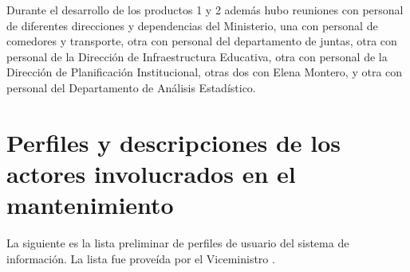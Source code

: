 \documentclass[9pt,a4paper]{IEEEtran}
\begin{document}
Durante el desarrollo de los productos 1 y 2 adem\'as hubo reuniones con personal de diferentes direcciones y dependencias del Ministerio, una con personal de comedores y transporte, otra con personal del departamento de juntas, otra con personal de la Direcci\'on de Infraestructura Educativa, otra con personal de la Direcci\'on de Planificaci\'on Institucional, otras dos con Elena Montero, y otra con personal del Departamento de An\'alisis Estad\'istico.

\section{Perfiles y descripciones de los actores involucrados en el mantenimiento} \label{sec:prof}

La siguiente es la lista preliminar de perfiles de usuario del sistema de informaci\'on. La lista fue prove\'ida por el Viceministro \cite{prop}.
\end{document}
